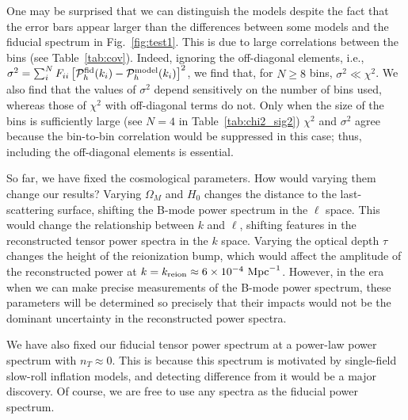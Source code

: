 \documentclass[tightenlines,floats,aps,nofootinbib,prd,onecolumn,preprintnumbers]{revtex4}
\newcommand{\PP}{\mathcal{P}}
\begin{document}
One may be surprised that we can distinguish the models despite the fact
that the error bars appear larger than the differences between some
models and the fiducial spectrum in Fig.~\ref{fig:test1}. This is due to
large correlations between the bins (see Table~\ref{tab:cov}). Indeed, ignoring the off-diagonal elements, i.e.,
$\sigma^2 = \sum_{i}^N F_{ii}\left[\PP_h^{\rm fid}(k_i) - \PP_h^{\rm
model}(k_i)\right]^2$, we find that, for $N\geq 8$ bins, $\sigma^2\ll
\chi^2$. We also find that the values of $\sigma^2$ depend sensitively
on the number of bins used, whereas those of $\chi^2$ with off-diagonal
terms do not. Only when the size of the bins is sufficiently large (see
$N=4$ in Table~\ref{tab:chi2_sig2}) $\chi^2$ and $\sigma^2$ agree because the
bin-to-bin correlation would be suppressed in this case; thus, including
the off-diagonal elements is essential.

So far, we have fixed the cosmological parameters. How would varying
them change our results? Varying $\Omega_M$ and $H_0$ changes the
distance to the last-scattering surface, shifting the B-mode power
spectrum in the $\ell$ space. This would change the relationship between
$k$ and $\ell$, shifting features in the reconstructed tensor power
spectra in the $k$ space. Varying the optical depth $\tau$ changes the
height of the reionization bump, which would affect the amplitude of the
reconstructed power at $k=k_{\rm reion}\approx 6\times 10^{-4}~{\rm
Mpc}^{-1}$. However, in the era when we can make precise measurements of
the B-mode power spectrum, these parameters will be determined so
precisely that their impacts would not be the dominant uncertainty in
the reconstructed power spectra. 

We have also fixed our fiducial tensor power spectrum at a power-law
power spectrum with $n_T\approx 0$. This is because this spectrum is
motivated by single-field slow-roll inflation models, and detecting
difference from it would be a major discovery. Of course, we are free to
use any spectra as the fiducial power spectrum.  
\end{document}
